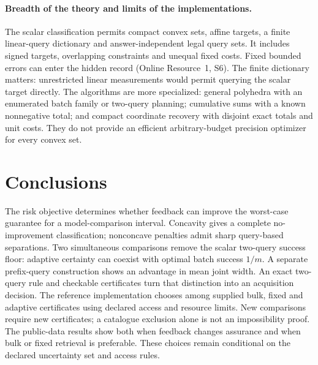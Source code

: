\documentclass[12pt]{article}
\begin{document}
\paragraph{Breadth of the theory and limits of the implementations.}
The scalar classification permits compact convex sets, affine targets, a
finite linear-query dictionary and answer-independent legal query sets.
It includes signed targets, overlapping constraints and unequal fixed costs.
Fixed bounded errors can enter the hidden record (Online Resource~1, S6).
The finite dictionary matters: unrestricted linear measurements would permit
querying the scalar target directly. The algorithms are more specialized:
general polyhedra with an enumerated batch family or two-query planning;
cumulative sums with a known nonnegative total; and compact coordinate
recovery with disjoint exact totals and unit costs. They do not provide an
efficient arbitrary-budget precision optimizer for every convex set.

\section{Conclusions}
The risk objective determines whether feedback can improve the worst-case
guarantee for a model-comparison interval. Concavity gives a complete
no-improvement classification; nonconcave penalties admit sharp query-based
separations. Two simultaneous comparisons remove the scalar two-query success floor:
adaptive certainty can coexist with optimal batch success $1/m$.
A separate prefix-query construction shows an advantage in mean joint width.
An exact two-query rule and checkable certificates turn that
distinction into an acquisition decision. The reference implementation chooses among supplied bulk, fixed and adaptive
certificates using declared access and resource limits. New comparisons require
new certificates; a catalogue exclusion alone is not an impossibility proof.
The public-data results show both when feedback changes assurance and when
bulk or fixed retrieval is preferable. These choices remain conditional on
the declared uncertainty set and access rules.
\end{document}
